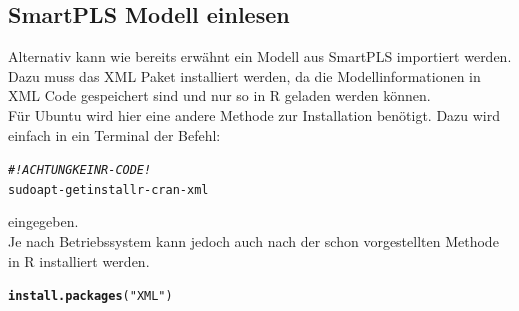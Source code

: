 \documentclass{article}\usepackage[]{graphicx}\usepackage[]{color}
\makeatletter
\newcommand{\hlstr}[1]{\textcolor[rgb]{0.192,0.494,0.8}{#1}}%
\newcommand{\hlcom}[1]{\textcolor[rgb]{0.678,0.584,0.686}{\textit{#1}}}%
\newcommand{\hlstd}[1]{\textcolor[rgb]{0.345,0.345,0.345}{#1}}%
\newcommand{\hlkwd}[1]{\textcolor[rgb]{0.737,0.353,0.396}{\textbf{#1}}}%
\newenvironment{kframe}{%
 \def\at@end@of@kframe{}%
 \ifinner\ifhmode%
  \def\at@end@of@kframe{\end{minipage}}%
  \begin{minipage}{\columnwidth}%
 \fi\fi%
 \def\FrameCommand##1{\hskip\@totalleftmargin \hskip-\fboxsep
 \colorbox{shadecolor}{##1}\hskip-\fboxsep
     \hskip-\linewidth \hskip-\@totalleftmargin \hskip\columnwidth}%
 \MakeFramed {\advance\hsize-\width
   \@totalleftmargin\z@ \linewidth\hsize
   \@setminipage}}%
 {\par\unskip\endMakeFramed%
 \at@end@of@kframe}
\newenvironment{knitrout}{}{} %
\makeatother
\begin{document}
\subsection{SmartPLS Modell einlesen}

Alternativ kann wie bereits erwähnt ein Modell aus SmartPLS importiert werden. Dazu muss das XML Paket installiert werden, da die Modellinformationen in XML Code gespeichert sind und nur so in R geladen werden können.\\
Für Ubuntu wird hier eine andere Methode zur Installation benötigt. Dazu wird einfach in ein Terminal der Befehl:
\begin{knitrout}
\color{fgcolor}\begin{kframe}
\begin{alltt}
\hlcom{#!ACHTUNG KEIN R-CODE!}
sudo apt-get install r-cran-xml
\end{alltt}
\end{kframe}
\end{knitrout}
eingegeben.\\
Je nach Betriebssystem kann jedoch auch nach der schon vorgestellten Methode in R installiert werden.
\begin{knitrout}
\color{fgcolor}\begin{kframe}
\begin{alltt}
\hlkwd{install.packages}\hlstd{(}\hlstr{"XML"}\hlstd{)}
\end{alltt}
\end{kframe}
\end{knitrout}
\end{document}
